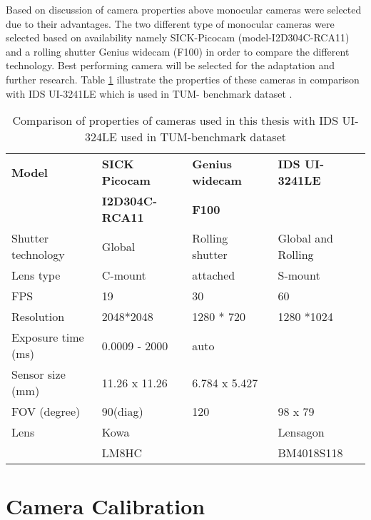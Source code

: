 \newline
Based on discussion of camera properties above monocular cameras were selected due to their advantages. The two different type of monocular cameras were selected based on availability namely SICK-Picocam (model-I2D304C-RCA11) and a rolling shutter Genius widecam (F100) in order to compare the different technology. Best performing camera will be selected for the adaptation and further research. Table \ref{table:camera_prop} illustrate the properties of these cameras in comparison with IDS UI-3241LE which is used in TUM- benchmark dataset \cite{engel2016photometrically}.
\begin{table}[h!]
	\centering
	\begin{tabular}{ | l | l | l | l |}
		\hline
		\textbf{Model} & \textbf{SICK Picocam}  & \textbf{Genius widecam}  & \textbf{IDS UI-3241LE}  \\  
		              & \textbf{I2D304C-RCA11} & \textbf{F100} &  \\  
		\hline
		Shutter technology & Global & Rolling shutter & Global and Rolling \\ 
		\hline
		Lens type         & C-mount & attached        & S-mount \\ 
		\hline
		FPS               & 19      & 30              & 60\\ 
		\hline
		Resolution       & 2048*2048  &  1280 * 720   & 1280 *1024 \\
		 \hline
		Exposure time (ms) & 0.0009 - 2000 & auto &    \\
		 \hline
		Sensor size (mm) & 11.26 x 11.26 & 6.784 x 5.427 &  \\
		 \hline
		FOV (degree) &  90(diag) &  120 & 98 x 79  \\
		 \hline
		Lens &  Kowa   &   & Lensagon \\
		     &  LM8HC  &   & BM4018S118  \\
		 \hline
	\end{tabular}
    \caption{Comparison of properties of cameras used in this thesis with IDS UI-324LE used in TUM-benchmark dataset}
    \label{table:camera_prop}
\end{table}
\section{Camera Calibration}

